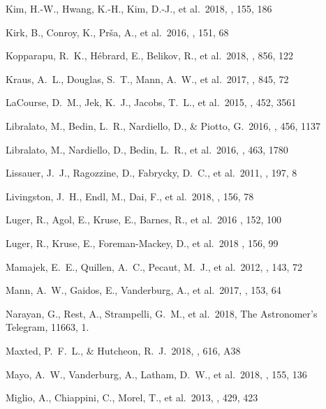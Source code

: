 \documentclass[modern]{aastex62}
\begin{document}
\begin{thebibliography}{}
 Kim, H.-W., Hwang, K.-H., Kim, D.-J., et al.\ 2018, \aj, 155, 186 

 Kirk, B., Conroy, K., Pr{\v s}a, A., et al.\ 2016, \aj, 151, 68 

 Kopparapu, R.~K., H{\'e}brard, E., Belikov, R., et al.\ 2018, \apj, 856, 122 

 Kraus, A.~L., Douglas, S.~T., Mann, A.~W., et al.\ 2017, \apj, 845, 72 

 LaCourse, D.~M., Jek, K.~J., Jacobs, T.~L., et al.\ 2015, \mnras, 452, 3561 

 Libralato, M., Bedin, L.~R., Nardiello, D., \& Piotto, G.\ 2016, \mnras, 456, 1137

 Libralato, M., Nardiello, D., Bedin, L.~R., et al.\ 2016, \mnras, 463, 1780 

 Lissauer, J.~J., Ragozzine, D., Fabrycky, D.~C., et al.\ 2011, \apjs, 197, 8 

 Livingston, J.~H., Endl, M., Dai, F., et al.\ 2018, \aj, 156, 78 

 Luger, R., Agol, E., Kruse, E., Barnes, R., et al.\ 2016 \aj, 152, 100

 Luger, R., Kruse, E., Foreman-Mackey, D., et al.\ 2018 \aj, 156, 99

 Mamajek, E.~E., Quillen, A.~C., Pecaut, M.~J., et al.\ 2012, \aj, 143, 72 

 Mann, A.~W., Gaidos, E., Vanderburg, A., et al.\ 2017, \aj, 153, 64 

 Narayan, G., Rest, A., Strampelli, G.~M., et al.\ 2018, The Astronomer's Telegram, 11663, 1.

 Maxted, P.~F.~L., \& Hutcheon, R.~J.\ 2018, \aap, 616, A38 

 Mayo, A.~W., Vanderburg, A., Latham, D.~W., et al.\ 2018, \aj, 155, 136 

 Miglio, A., Chiappini, C., Morel, T., et al.\ 2013, \mnras, 429, 423 


\end{thebibliography}
\end{document}
